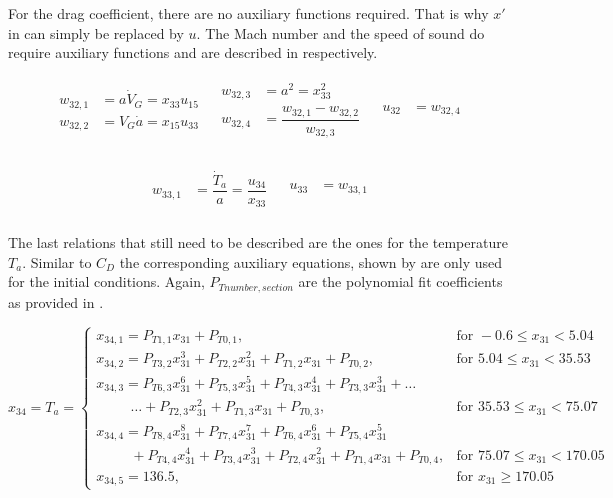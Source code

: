 \noindent
For the drag coefficient, there are no auxiliary functions required. That is why $x'$ in  can simply be replaced by $u$. The Mach number and the speed of sound do require auxiliary functions and are described in  respectively.

\begin{align} \label{eq:u32}
\begin{split}
w_{32,1} &= a\dot{V}_{G} = x_{33}u_{15} \\
w_{32,2} &= V_{G}\dot{a} = x_{15}u_{33} \\
\end{split}
&
\begin{split}
w_{32,3} &= a^{2} = x_{33}^2 \\
w_{32,4} &= \dfrac{w_{32,1}-w_{32,2}}{w_{32,3}} \\
\end{split}
&
\begin{split}
u_{32} &= w_{32,4} \\
\end{split}
\end{align}

\begin{align} \label{eq:u33}
\begin{split}
w_{33,1} &= \dfrac{\dot{T}_{a}}{a} = \dfrac{u_{34}}{x_{33}} \\
\end{split}
&
\begin{split}
u_{33} &= w_{33,1} \\
\end{split}
\end{align}

\noindent
The last relations that still need to be described are the ones for the temperature $T_{a}$. Similar to $C_{D}$ the corresponding auxiliary equations, shown by  are only used for the initial conditions. Again, $P_{T number,section}$ are the polynomial fit coefficients as provided in .

\begin{equation}\label{eq:tempCondAux}
x_{34}=T_{a}=\begin{cases}
x_{34,1}=P_{T 1,1}x_{31}+P_{T 0,1}, & \text{for } -0.6 \leq x_{31} < 5.04  \\
x_{34,2}=P_{T 3,2}x_{31}^{3}+P_{T 2,2}x_{31}^{2}+P_{T 1,2}x_{31}+P_{T 0,2}, &  \text{for } 5.04 \leq x_{31} < 35.53   \\
x_{34,3}=P_{T 6,3}x_{31}^{6}+P_{T 5,3}x_{31}^{5}+P_{T 4,3}x_{31}^{4}+P_{T 3,3}x_{31}^{3}+ \dots \\
\qquad\ \ \dotsc +P_{T 2,3}x_{31}^{2}+P_{T 1,3}x_{31}+P_{T 0,3}, &  \text{for } 35.53 \leq x_{31} < 75.07   \\
x_{34,4}=P_{T 8,4}x_{31}^{8}+P_{T 7,4}x_{31}^{7}+P_{T 6,4}x_{31}^{6}+P_{T 5,4}x_{31}^{5} \\
\qquad\ \ +P_{T 4,4}x_{31}^{4}+P_{T 3,4}x_{31}^{3}+P_{T 2,4}x_{31}^{2}+P_{T 1,4}x_{31}+P_{T 0,4}, &  \text{for } 75.07 \leq x_{31} < 170.05   \\
x_{34,5}=136.5, &  \text{for }  x_{31} \geq 170.05   
\end{cases}
\end{equation}

